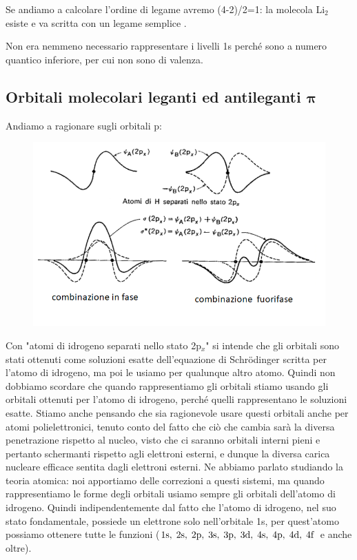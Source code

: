 Se andiamo a calcolare l'ordine di legame avremo (4-2)/2=1: la molecola Li$_2$ esiste e va scritta con un legame semplice .

Non era nemmeno necessario rappresentare i livelli 1s perché sono a numero quantico inferiore, per cui non sono di valenza.

\newpage

\subsection{Orbitali molecolari leganti ed antileganti $\boldsymbol{\pi}$}
Andiamo a ragionare sugli orbitali p:

\begin{figure}[htp]
    \centering
    \includegraphics[width=14cm]{immagini/orbitali_molecolari_pigreco.png}
\end{figure}

\vspace{-1cm}Con "atomi di idrogeno separati nello stato 2p$_x$" si intende che gli orbitali sono stati ottenuti come soluzioni esatte dell'equazione di Schrödinger scritta per l'atomo di idrogeno, ma poi le usiamo per qualunque altro atomo. Quindi non dobbiamo scordare che quando rappresentiamo gli orbitali stiamo usando gli orbitali ottenuti per l'atomo di idrogeno, perché quelli rappresentano le soluzioni esatte. Stiamo anche pensando che sia ragionevole usare questi orbitali anche per atomi polielettronici, tenuto conto del fatto che ciò che cambia sarà la diversa penetrazione rispetto al nucleo, visto che ci saranno orbitali interni pieni e pertanto schermanti rispetto agli elettroni esterni, e dunque la diversa carica nucleare efficace sentita dagli elettroni esterni. Ne abbiamo parlato studiando la teoria atomica: noi apportiamo delle correzioni a questi sistemi, ma quando rappresentiamo le forme degli orbitali usiamo sempre gli orbitali dell'atomo di idrogeno. Quindi indipendentemente dal fatto che l'atomo di idrogeno, nel suo stato fondamentale, possiede un elettrone solo nell'orbitale 1s, per quest'atomo possiamo ottenere tutte le funzioni ($ \rm 1s, \; 2s, \; 2p, \; 3s, \; 3p, \; 3d, \; 4s, \; 4p, \; 4d, \; 4f$ e anche oltre).

